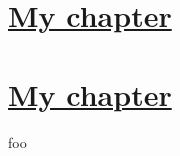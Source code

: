 \documentclass{book}
\begin{document}
    
\tableofcontents

\chapter{\protect\hyperlink{chap:\thechapter}{My chapter}}

\chapter{\protect\hyperlink{chap:\thechapter}{My chapter}}

foo     
\end{document}
